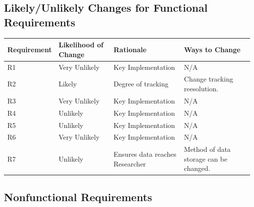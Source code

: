 \documentclass[12pt]{article}
\begin{document}
\subsection{Likely/Unlikely Changes for Functional Requirements}    

\begin{tabularx}{1.05\textwidth} { 
  | >{\raggedright\arraybackslash}X 
  | >{\centering\arraybackslash}X 
  | >{\centering\arraybackslash}X 
  | >{\raggedleft\arraybackslash}X | }
 \hline
 Requirement & Likelihood of Change& Rationale & Ways to Change \\
 \hline
 R1  & Very Unlikely  & Key Implementation & N/A  \\
 \hline
 R2  & Likely  &Degree of tracking& Change tracking reesolution.  \\
 \hline
 R3  & Very Unlikely  & Key Implementation & N/A  \\
 \hline
 R4  & Unlikely  & Key Implementation & N/A  \\
\hline
 R5  & Unlikely & Key Implementation &  N/A \\
 \hline
 R6  & Very Unlikely  & Key Implementation & N/A  \\
\hline
 R7  & Unlikely  & Ensures data reaches Researcher & Method of data storage can be changed.  \\
\hline
\end{tabularx}


\subsection{Nonfunctional Requirements}
\end{document}
